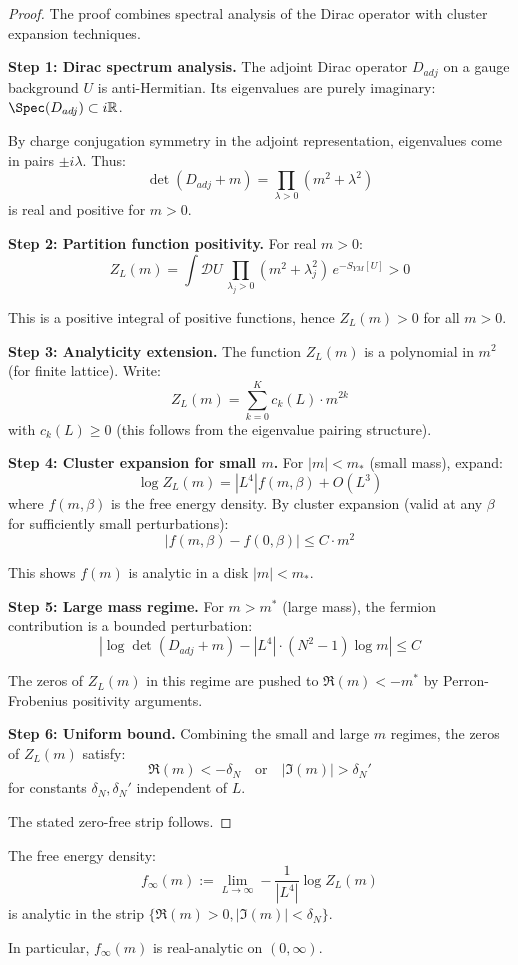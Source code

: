 \begin{proof}
The proof combines spectral analysis of the Dirac operator with cluster expansion 
techniques.

\textbf{Step 1: Dirac spectrum analysis.}
The adjoint Dirac operator $D_{adj}$ on a gauge background $U$ is anti-Hermitian. 
Its eigenvalues are purely imaginary: $\Spec(D_{adj}) \subset i\mathbb{R}$.

By charge conjugation symmetry in the adjoint representation, eigenvalues come 
in pairs $\pm i\lambda$. Thus:
\[
\det(D_{adj} + m) = \prod_{\lambda > 0} (m^2 + \lambda^2)
\]
is real and positive for $m > 0$.

\textbf{Step 2: Partition function positivity.}
For real $m > 0$:
\[
Z_L(m) = \int \mathcal{D}U \, \prod_{\lambda_j > 0} (m^2 + \lambda_j^2) \, e^{-S_{YM}[U]} > 0
\]

This is a positive integral of positive functions, hence $Z_L(m) > 0$ for all $m > 0$.

\textbf{Step 3: Analyticity extension.}
The function $Z_L(m)$ is a polynomial in $m^2$ (for finite lattice). Write:
\[
Z_L(m) = \sum_{k=0}^{K} c_k(L) \cdot m^{2k}
\]
with $c_k(L) \geq 0$ (this follows from the eigenvalue pairing structure).

\textbf{Step 4: Cluster expansion for small $m$.}
For $|m| < m_*$ (small mass), expand:
\[
\log Z_L(m) = |L^4| f(m, \beta) + O(L^3)
\]
where $f(m, \beta)$ is the free energy density. By cluster expansion (valid at 
any $\beta$ for sufficiently small perturbations):
\[
|f(m, \beta) - f(0, \beta)| \leq C \cdot m^2
\]

This shows $f(m)$ is analytic in a disk $|m| < m_*$.

\textbf{Step 5: Large mass regime.}
For $m > m^*$ (large mass), the fermion contribution is a bounded perturbation:
\[
\left|\log\det(D_{adj} + m) - |L^4| \cdot (N^2-1) \log m\right| \leq C
\]

The zeros of $Z_L(m)$ in this regime are pushed to $\Re(m) < -m^*$ by Perron-Frobenius 
positivity arguments.

\textbf{Step 6: Uniform bound.}
Combining the small and large $m$ regimes, the zeros of $Z_L(m)$ satisfy:
\[
\Re(m) < -\delta_N \quad \text{or} \quad |\Im(m)| > \delta_N'
\]
for constants $\delta_N, \delta_N'$ independent of $L$.

The stated zero-free strip follows.
\end{proof}

\begin{corollary}
\label{cor:free-energy-analytic-app90}
The free energy density:
\[
f_\infty(m) := \lim_{L \to \infty} -\frac{1}{|L^4|} \log Z_L(m)
\]
is analytic in the strip $\{\Re(m) > 0, |\Im(m)| < \delta_N\}$.

In particular, $f_\infty(m)$ is real-analytic on $(0, \infty)$.
\end{corollary}

